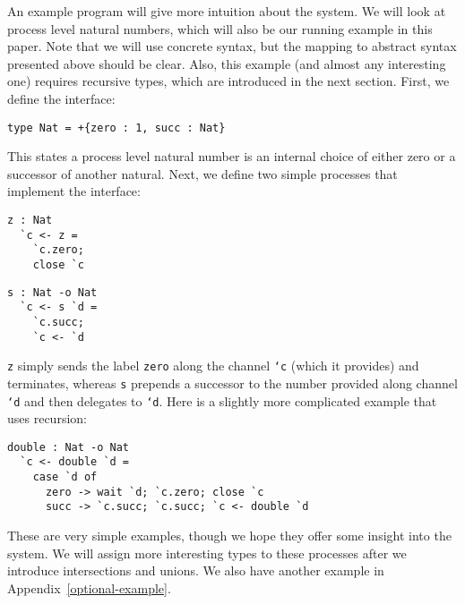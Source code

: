 \documentclass[a4paper,USenglish]{lipics-v2016}
\begin{document}
An example program will give more intuition about the system. We will look at process level natural numbers, which will also be our running example in this paper. Note that we will use concrete syntax, but the mapping to abstract syntax presented above should be clear. Also, this example (and almost any interesting one) requires recursive types, which are introduced in the next section. 
First, we define the interface:

\begin{lstlisting}[language=krill, style=custom]
  type Nat = +{zero : 1, succ : Nat}
\end{lstlisting}

This states a process level natural number is an internal choice of either zero or a successor of another natural. Next, we define two simple processes that implement the interface:

\begin{minipage}{.48\textwidth}
\begin{lstlisting}[language=krill, style=custom]
  z : Nat
  `c <- z =
    `c.zero;
    close `c
\end{lstlisting}
\end{minipage}
\hfill
\begin{minipage}{.48\textwidth}
\begin{lstlisting}[language=krill, style=custom]
  s : Nat -o Nat
  `c <- s `d =
    `c.succ;
    `c <- `d
\end{lstlisting}
\end{minipage}

\texttt{z} simply sends the label \texttt{zero} along the channel \texttt{`c} (which it provides) and terminates, whereas \texttt{s} prepends a successor to the number provided along channel \texttt{`d} and then delegates to \texttt{`d}. Here is a slightly more complicated example that uses recursion:

\begin{lstlisting}[language=krill, style=custom]
  double : Nat -o Nat
  `c <- double `d =
    case `d of
      zero -> wait `d; `c.zero; close `c
      succ -> `c.succ; `c.succ; `c <- double `d
\end{lstlisting}

These are very simple examples, though we hope they offer some insight into the system. We will assign more interesting types to these processes after we introduce intersections and unions. We also have another example in Appendix~\ref{optional-example}.
\end{document}
